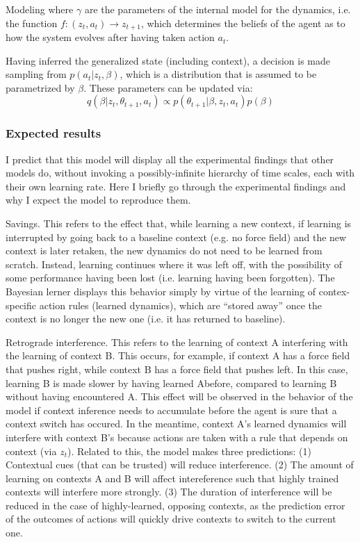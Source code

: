 \documentclass{report}
\begin{document}
\begin{chapter}{Modeling}
where $\gamma$ are the parameters of the internal model for the dynamics,
i.e. the function $f: (z_t, a_t) \rightarrow z_{t+1}$, which determines the beliefs of
the agent as to how the system evolves after having taken action $a_t$.

Having inferred the generalized state (including context), a decision is made
sampling from $p(a_t | z_t, \beta)$, which is a distribution that is assumed to
be parametrized by $\beta$. These parameters can be updated via:
\[
q(\beta | z_t, \theta_{t+1}, a_t) \propto p(\theta_{t+1} | \beta, z_t,
a_t)p(\beta) \label{eqn:update-parameters}
\]

\subsubsection{Expected results}
I predict that this model will display all the experimental findings that other
models do, without invoking a possibly-infinite hierarchy of time scales, each
with their own learning rate. Here I briefly go through the experimental
findings and why I expect the model to reproduce them.

Savings. This refers to the effect that, while learning a new context, if
learning is interrupted by going back to a baseline context (e.g. no force
field) and the new context is later retaken, the new dynamics do not need to be
learned from scratch. Instead, learning continues where it was left off, with
the possibility of some performance having been lost (i.e. learning having been
forgotten). The Bayesian lerner displays this behavior simply by virtue of the
learning of contex-specific action rules (learned dynamics), which are ``stored
away'' once the context is no longer the new one (i.e. it has returned to
baseline).

Retrograde interference. This refers to the learning of context A interfering
with the learning of context B. This occurs, for example, if context A has a
force field that pushes right, while context B has a force field that pushes
left. In this case, learning B is made slower by having learned Abefore,
compared to learning B without having encountered A. This effect will be
observed in the behavior of the model if context inference needs to accumulate
before the agent is sure that a context switch has occured. In the meantime,
context A's learned dynamics will interfere with context B's because actions are
taken with a rule that depends on context (via $z_t$). Related to this, the
model makes three predictions: (1) Contextual cues (that can be trusted) will
reduce interference. (2) The amount of learning on contexts A and B will affect
intereference such that highly trained contexts will interfere more
strongly. (3) The duration of interference will be reduced in the case of
highly-learned, opposing contexts, as the prediction error of the outcomes of
actions will quickly drive contexts to switch to the current one.


\end{chapter}
\end{document}
